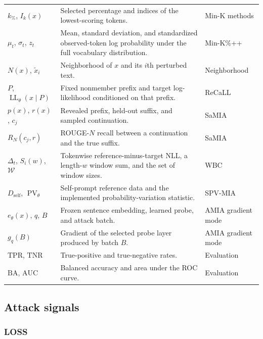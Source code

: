 \documentclass[11pt]{article}
\newcommand{\LL}{\operatorname{LL}}
\begin{document}
\begin{longtable}{@{}L{0.19\textwidth}L{0.55\textwidth}L{0.19\textwidth}@{}}
$k_{\%}$, $I_k(x)$ & Selected percentage and indices of the lowest-scoring tokens. & Min-K methods \\
$\mu_t$, $\sigma_t$, $z_t$ & Mean, standard deviation, and standardized observed-token log probability under the full vocabulary distribution. & Min-K\%++ \\
$N(x)$, $\widetilde x_i$ & Neighborhood of $x$ and its $i$th perturbed text. & Neighborhood \\
$P$, $\LL_\theta(x\mid P)$ & Fixed nonmember prefix and target log-likelihood conditioned on that prefix. & ReCaLL \\
$p(x)$, $r(x)$, $c_j$ & Revealed prefix, held-out suffix, and sampled continuation. & SaMIA \\
$R_N(c_j,r)$ & ROUGE-$N$ recall between a continuation and the true suffix. & SaMIA \\
$\Delta_t$, $S_i(w)$, $\mathcal W$ & Tokenwise reference-minus-target NLL, a length-$w$ window sum, and the set of window sizes. & WBC \\
$D_{\mathrm{self}}$, $\operatorname{PV}_\theta$ & Self-prompt reference data and the implemented probability-variation statistic. & SPV-MIA \\
$e_\theta(x)$, $q$, $B$ & Frozen sentence embedding, learned probe, and attack batch. & AMIA gradient mode \\
$g_q(B)$ & Gradient of the selected probe layer produced by batch $B$. & AMIA gradient mode \\
$\mathrm{TPR}$, $\mathrm{TNR}$ & True-positive and true-negative rates. & Evaluation \\
$\mathrm{BA}$, $\mathrm{AUC}$ & Balanced accuracy and area under the ROC curve. & Evaluation \\
\end{longtable}
\normalsize

\subsection{Attack signals}

\subsubsection{LOSS}
\end{document}
